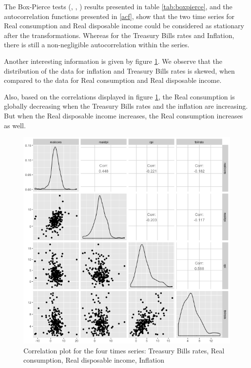 The Box-Pierce tests (\cite{box1970distribution}, \cite{ljung1978measure}, \cite{harvey1993time}) results presented in table \ref{tab:boxpierce}, and the autocorrelation functions presented in \ref{acf}, show that the two time series for Real consumption and Real disposable income could be considered as stationary after the transformations. Whereas for the Treasury Bills rates and Inflation, there is still a non-negligible autocorrelation within the series. 

\medskip

Another interesting information is given by figure \ref{corrplot}. We observe that the distribution of the data for inflation and Treasury Bills rates is skewed, when compared to the data for Real consumption and Real disposable income. 

\medskip

Also, based on the correlations displayed in figure \ref{corrplot}, the Real consumption is globally  decreasing when the Treasury Bills rates and the inflation are increasing. But when the Real disposable income increases, the Real consumption increases as well. 

\begin{figure}[!htb]
\centering
\includegraphics[width=14cm]{gfx/chapter-rvfl-ensembles/scatterplot.png}
\caption{Correlation plot for the four times series: Treasury Bills rates, Real consumption, Real disposable income, Inflation}
\label{corrplot}
\end{figure}

